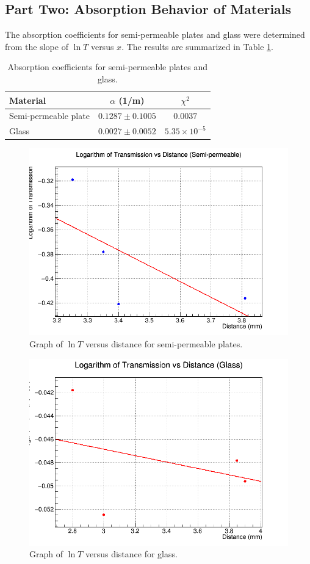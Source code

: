 \documentclass[journal]{IEEEtran}
\begin{document}
\subsection{Part Two: Absorption Behavior of Materials}
The absorption coefficients for semi-permeable plates and glass were determined from the slope of $\ln T$ versus $x$. The results are summarized in Table \ref{tab:attenuation_coefficients}.

\begin{table}[H]
    \centering
    \caption{Absorption coefficients for semi-permeable plates and glass.}
    \label{tab:attenuation_coefficients}
    \begin{tabular}{@{}lcc@{}}
        \toprule
        Material            & $\alpha$ (1/m) & $\chi^2$ \\ \midrule
        Semi-permeable plate & $0.1287 \pm 0.1005$ & $0.0037$ \\
        Glass               & $0.0027 \pm 0.0052$ & $5.35 \times 10^{-5}$ \\ \bottomrule
    \end{tabular}
\end{table}

\begin{figure}[H]
    \centering
    \includegraphics[width=0.8\linewidth]{../plots/logT_vs_distance_semi_permeable.png}
    \caption{Graph of $\ln T$ versus distance for semi-permeable plates.}
    \label{fig:logT_semi_permeable}
\end{figure}

\begin{figure}[H]
    \centering
    \includegraphics[width=0.8\linewidth]{../plots/logT_vs_distance_glass.png}
    \caption{Graph of $\ln T$ versus distance for glass.}
    \label{fig:logT_glass}
\end{figure}
\end{document}
